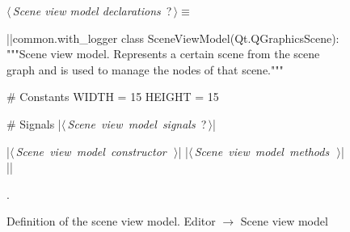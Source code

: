 \documentclass[%
    a4paper,    %
    justified,  %
    nobib,      %
    openany     %
]{tufte-book}
\makeatletter
\renewcommand{\label}[1]{\@tufte@label{##1}}%
\makeatother
\begin{document}
\begin{figure}
\begin{flushleft} \small
\begin{minipage}{\linewidth}\label{scrap89}\raggedright\small
{} $\langle\,${\itshape Scene view model declarations}\nobreak\ {\footnotesize {?}}$\,\rangle\equiv$
\vspace{-1ex}
\begin{pythoncode}
|\normalfont{}\fontfamily{}|common.with_logger
class SceneViewModel(Qt.QGraphicsScene):
    """Scene view model.
    Represents a certain scene from the scene graph and is used to manage the
    nodes of that scene."""

    # Constants
    WIDTH = 15
    HEIGHT = 15

    # Signals
    |\hbox{$\langle\,${\itshape Scene view model signals}\nobreak\ {\footnotesize ?}$\,\rangle$}|

    |\hbox{$\langle\,${\itshape Scene view model constructor}\nobreak\ {\footnotesize {}}$\,\rangle$}|
    |\hbox{$\langle\,${\itshape Scene view model methods}\nobreak\ {\footnotesize {}}$\,\rangle$}|
|\NWsep|
\end{pythoncode}
\vspace{1.5ex}
\footnotesize
\begin{list}{}{\setlength{\itemsep}{-\parsep}\setlength{\itemindent}{-\leftmargin}}
\item {\NWtxtMacroNoRef}.

\item{}
\end{list}
\end{minipage}\vspace{4ex}
\end{flushleft}
\caption{Definition of the scene view model.
  \newline{}\newline{}Editor $\rightarrow$ Scene view model}
\label{editor:lst:scene-view-model}
\end{figure}
\end{document}
